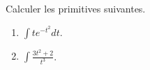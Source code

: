 
\begin{exercice}\label{exoTD5-0005}

	Calculer les primitives suivantes.
	\begin{enumerate}
		\item		\label{Itemintizcxexsq}
			$\int t e^{-t^2}dt$.
		\item		\label{ItemTDczcii}
			$\int\frac{ 3t^2 +2}{ t^3 }$.
	\end{enumerate}
	

\end{exercice}
